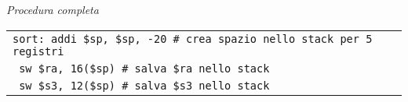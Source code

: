\documentclass[../main.tex]{subfiles}
\begin{document}
\vspace*{5mm}

\noindent
\textit{Procedura completa} \\[1mm]
\begin{tabular}{ l }
    \hline
    \hline
    \texttt{sort:\hspace*{0cm} \hspace*{0cm} \hspace*{0cm} \hspace*{0cm} addi \$sp, \$sp, -20 \hspace*{0cm} \hspace*{0cm} \hspace*{0cm} \hspace*{0cm} \# crea spazio nello stack per 5 registri \hspace*{0cm} \hspace*{0cm} } \\
    \texttt{\hspace*{0cm} \hspace*{0cm} \hspace*{0cm} \hspace*{0cm} \hspace*{0cm} \hspace*{0cm} \hspace*{0cm} \hspace*{0cm} \hspace*{0cm} sw \$ra, 16(\$sp) \hspace*{0cm} \hspace*{0cm} \hspace*{0cm} \hspace*{0cm} \hspace*{0cm} \hspace*{0cm} \hspace*{0cm} \# salva \$ra nello stack} \\
    \texttt{\hspace*{0cm} \hspace*{0cm} \hspace*{0cm} \hspace*{0cm} \hspace*{0cm} \hspace*{0cm} \hspace*{0cm} \hspace*{0cm} \hspace*{0cm} sw \$s3, 12(\$sp) \hspace*{0cm} \hspace*{0cm} \hspace*{0cm} \hspace*{0cm} \hspace*{0cm} \hspace*{0cm} \hspace*{0cm} \# salva \$s3 nello stack} \\

\end{tabular}
\end{document}
